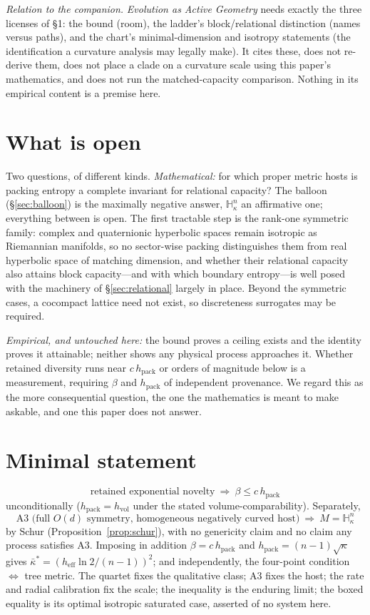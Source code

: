 \documentclass[11pt,reqno]{amsart}
\theoremstyle{plain}
\theoremstyle{definition}
\newcommand{\hpack}{h_{\mathrm{pack}}}
\newcommand{\hvol}{h_{\mathrm{vol}}}
\newcommand{\heff}{h_{\mathrm{eff}}}
\newcommand{\Hk}{\mathbb{H}^n_\kappa}
\begin{document}
\emph{Relation to the companion.} \emph{Evolution as Active Geometry} needs exactly the three licenses of \S1: the bound (room), the ladder's block/relational distinction (names versus paths), and the chart's minimal-dimension and isotropy statements (the identification a curvature analysis may legally make). It cites these, does not re-derive them, does not place a clade on a curvature scale using this paper's mathematics, and does not run the matched-capacity comparison. Nothing in its empirical content is a premise here.

\section{What is open}\label{sec:open}

Two questions, of different kinds. \emph{Mathematical:} for which proper metric hosts is packing entropy a complete invariant for relational capacity? The balloon (\S\ref{sec:balloon}) is the maximally negative answer, $\Hk$ an affirmative one; everything between is open. The first tractable step is the rank-one symmetric family: complex and quaternionic hyperbolic spaces remain isotropic as Riemannian manifolds, so no sector-wise packing distinguishes them from real hyperbolic space of matching dimension, and whether their relational capacity also attains block capacity---and with which boundary entropy---is well posed with the machinery of \S\ref{sec:relational} largely in place. Beyond the symmetric cases, a cocompact lattice need not exist, so discreteness surrogates may be required.

\emph{Empirical, and untouched here:} the bound proves a ceiling exists and the identity proves it attainable; neither shows any physical process approaches it. Whether retained diversity runs near $c\,\hpack$ or orders of magnitude below is a measurement, requiring $\beta$ and $\hpack$ of independent provenance. We regard this as the more consequential question, the one the mathematics is meant to make askable, and one this paper does not answer.

\clearpage
\appendix
\section{Minimal statement}
\[
\boxed{\text{retained exponential novelty}\ \Longrightarrow\ \beta\le c\,\hpack}
\]
unconditionally ($\hpack=\hvol$ under the stated volume-comparability). Separately,
\[
\boxed{\text{A3 (full }O(d)\text{ symmetry, homogeneous negatively curved host)}\ \Longrightarrow\ M=\Hk}
\]
by Schur (Proposition~\ref{prop:schur}), with no genericity claim and no claim any process satisfies A3. Imposing in addition $\beta=c\,\hpack$ and $\hpack=(n-1)\sqrt\kappa$ gives $\bar\kappa^*=(\heff\ln2/(n-1))^2$; and independently, the four-point condition $\Leftrightarrow$ tree metric. The quartet fixes the qualitative class; A3 fixes the host; the rate and radial calibration fix the scale; the inequality is the enduring limit; the boxed equality is its optimal isotropic saturated case, asserted of no system here.
\end{document}

